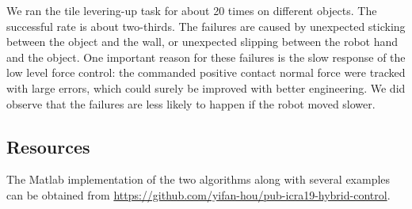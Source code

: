 We ran the tile levering-up task for about 20 times on different objects. The successful rate is about two-thirds. The failures are caused by unexpected sticking between the object and the wall, or unexpected slipping between the robot hand and the object. One important reason for these failures is the slow response of the low level force control: the commanded positive contact normal force were tracked with large errors, which could surely be improved with better engineering. We did observe that the failures are less likely to happen if the robot moved slower.

\subsection{Resources} %
\label{sub:code}
The Matlab implementation of the two algorithms along with several examples can be obtained from \href{https://github.com/yifan-hou/pub-icra19-hybrid-control}{https://github.com/yifan-hou/pub-icra19-hybrid-control}.


